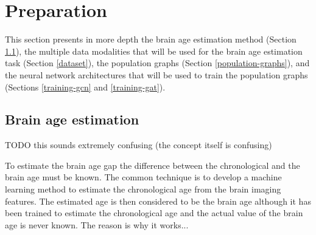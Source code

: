 \chapter{Preparation}


This section presents in more depth the brain age estimation method (Section \ref{brain-age-estimation}), the multiple data modalities that will be used for the brain age estimation task (Section \ref{dataset}), the population graphs (Section \ref{population-graphs}), and the neural network architectures that will be used to train the population graphs (Sections \ref{training-gcn} and \ref{training-gat}).


\section{Brain age estimation}
\label{brain-age-estimation}
TODO this sounds extremely confusing (the concept itself is confusing)

To estimate the brain age gap the difference between the chronological and the brain age must be known. The common technique is to develop a machine learning method to estimate the chronological age from the brain imaging features. The estimated age is then considered to be the brain age although it has been trained to estimate the chronological age and the actual value of the brain age is never known. The reason is why it works... \cite{niu2019improved}

